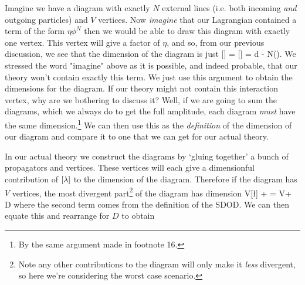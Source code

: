 Imagine we have a diagram with exactly $N$ external lines (i.e. both incoming \textit{and} outgoing particles) and $V$ vertices. Now \textit{imagine} that our Lagrangian contained a term of the form $\eta\phi^N$ then we would be able to draw this diagram with exactly one vertex. This vertex will give a factor of $\eta$, and so, from our previous discussion, we see that the dimension of the diagram is just 
\be
\label{eqn:DiagramDimension}
    [] = [\eta] = d - N\bigg(\bigg).
\ee 
We stressed the word "imagine" above as it is possible, and indeed probable, that our theory won't contain exactly this term. We just use this argument to obtain the dimensions for the diagram. If our theory might not contain this interaction vertex, why are we bothering to discuss it? Well, if we are going to sum the diagrams, which we always do to get the full amplitude, each diagram \textit{must} have the same dimension.\footnote{By the same argument made in footnote 16.} We can then use this as the \textit{definition} of the dimension of our diagram and compare it to one that we can get for our actual theory. 

In our actual theory we construct the diagrams by `gluing together' a bunch of propagators and vertices. These vertices will each give a dimensionful contribution of $[\lambda]$ to the dimension of the diagram. Therefore if the diagram has $V$ vertices, the most divergent part\footnote{Note any other contributions to the diagram will only make it \textit{less} divergent, so here we're considering the worst case scenario.} of the diagram has dimension
\bse 
    V[\l] +  = V + D
\ese 
where the second term comes from the definition of the SDOD. We can then equate this  and rearrange for $D$ to obtain

